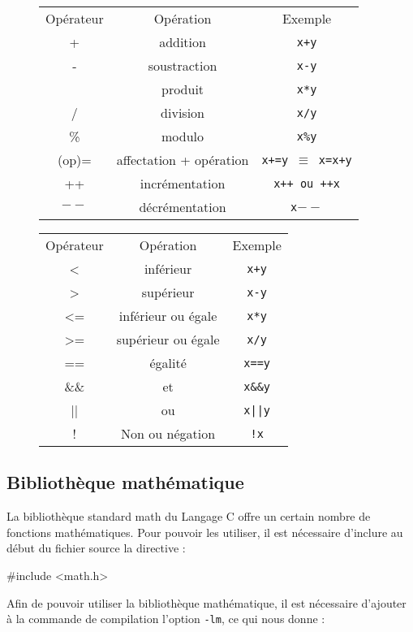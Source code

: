 \documentclass[10pt,a4paper]{article}
\begin{document}
\begin{figure}[h]
\centering
\begin{tabular}{c|c|c||}

Opérateur & Opération & Exemple \\
+ & addition & \texttt{x+y}\\
- & soustraction & \texttt{x-y}\\
 {\large *}  & produit & \texttt{x*y}\\
/ & division & \texttt{x/y}\\
\% & modulo & \texttt{x\%y}\\
(op)=& affectation + opération & \texttt{x+=y $\equiv$ x=x+y}\\
++ &incrémentation & \texttt{x++ ou ++x}\\
$--$ &décrémentation & \texttt{x$--$}\\

\end{tabular}
\centering
\begin{tabular}{c|c|c}

Opérateur & Opération & Exemple \\
< & inférieur & \texttt{x+y}\\
> & supérieur & \texttt{x-y}\\
<= & inférieur ou égale & \texttt{x*y}\\
>= & supérieur ou égale & \texttt{x/y}\\
== & égalité & \texttt{x==y}\\
\&\& & et & \texttt{x\&\&y}\\
|| & ou & \texttt{x||y}\\
! & Non ou négation & \texttt{!x}\\

\end{tabular}
\end{figure}

\subsection{Bibliothèque mathématique}

 La bibliothèque standard math du Langage C offre un certain nombre de fonctions mathématiques. Pour pouvoir les utiliser, il est nécessaire d'inclure au début du fichier source la directive :
\begin{cCode}
#include <math.h> 
\end{cCode}
Afin de pouvoir utiliser la bibliothèque mathématique, il est nécessaire d’ajouter à la commande de compilation l'option \texttt{-lm}, ce qui nous donne :
\end{document}
